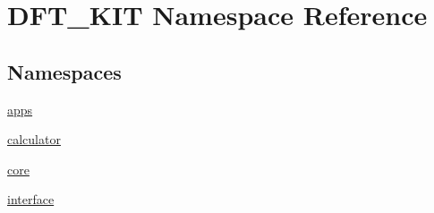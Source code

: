 \hypertarget{namespace_d_f_t___k_i_t}{\section{D\+F\+T\+\_\+\+K\+I\+T Namespace Reference}
\label{namespace_d_f_t___k_i_t}
}
\subsection*{Namespaces}
\begin{DoxyCompactItemize}
\item 
 \hyperlink{namespace_d_f_t___k_i_t_1_1apps}{apps}
\item 
 \hyperlink{namespace_d_f_t___k_i_t_1_1calculator}{calculator}
\item 
 \hyperlink{namespace_d_f_t___k_i_t_1_1core}{core}
\item 
 \hyperlink{namespace_d_f_t___k_i_t_1_1interface}{interface}
\end{DoxyCompactItemize}

